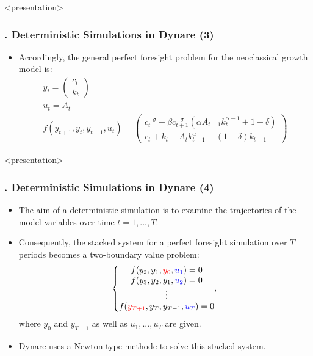 \documentclass[11pt,aspectratio=169]{beamer}
\begin{document}
\begin{frame}<presentation>
	\frametitle{{\thesection.\thesubsection} Deterministic Simulations in Dynare (3)}
	\begin{itemize}
		\item Accordingly, the general perfect foresight problem for the neoclassical growth model is:
		\begin{gather*}
			y_t = \begin{pmatrix} c_t \\ k_t \end{pmatrix} \\
			u_t = A_t \\
			f(y_{t+1},y_t,y_{t-1},u_t) = \begin{pmatrix} 	c_t^{-\sigma} - \beta c_{t+1}^{-\sigma} (\alpha A_{t+1} k_t^{\alpha -1} + 1 - \delta)\\ c_t + k_t - A_t k_{t-1}^\alpha - (1-\delta) k_{t-1} \end{pmatrix}
		\end{gather*}
	\end{itemize}
\end{frame}
\begin{frame}<presentation>
	\frametitle{{\thesection.\thesubsection} Deterministic Simulations in Dynare (4)}
	\begin{itemize}
		\item The aim of a deterministic simulation is to examine the trajectories of the model variables over time $t = 1,...,T$. 
		\item Consequently, the stacked system for a perfect foresight simulation over $T$ periods becomes a two-boundary value problem: 
		$$\left\{ \begin{matrix} f(y_2,y_1,\mathbin{\textcolor{red}{y_0}},\mathbin{\textcolor{blue}{u_1}})=0 \\ 
		f(y_3,y_2,y_1,\mathbin{\textcolor{blue}{u_2}})=0 \\ 
		\vdots \\ 
		f(\mathbin{\textcolor{red}{y_{T+1}}},y_T,y_{T-1},\mathbin{\textcolor{blue}{u_T}})=0 
		\end{matrix},  \right.$$ 
		where $y_0$ and $y_{T+1}$ as well as $u_1,...,u_T$ are given.
		\item Dynare uses a Newton-type methode to solve this stacked system.
	\end{itemize}
\end{frame}
\end{document}
